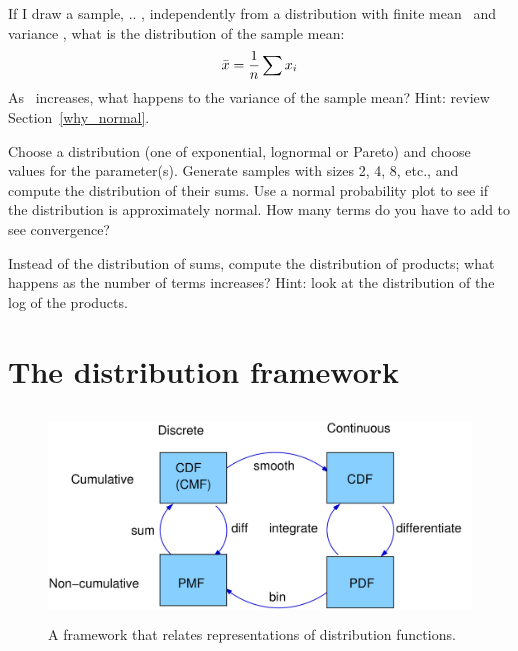 \documentclass[12pt]{book}
\begin{document}
\begin{exercise}
If I draw a sample, \x{} .. \x{}, independently from a
distribution with finite mean \mymu~and variance \sigmasq, what is
the distribution of the sample mean:
%
\[ \bar{x} = \frac{1}{n} \sum x_i \]
%
As \n~increases, what happens to the variance of the sample mean?
Hint: review Section~\ref{why_normal}.

\end{exercise}

\begin{exercise}
Choose a distribution (one of exponential, lognormal or Pareto) and
choose values for the parameter(s).  Generate samples with sizes
2, 4, 8, etc., and compute the distribution of their sums.  Use
a normal probability plot to see if the distribution is approximately
normal.  How many terms do you have to add to see convergence?


\end{exercise}


\begin{exercise}
Instead of the distribution of sums, compute the distribution of
products; what happens as the number of terms increases?
Hint: look at the distribution of the log of the products.

\end{exercise}

\section{The distribution framework}

\begin{figure}
\centerline{\includegraphics[height=2.2in]{figs/distribution_functions.pdf}}
\caption{A framework that relates representations of distribution
functions.}
\label{dist_framework}
\end{figure}
\end{document}
